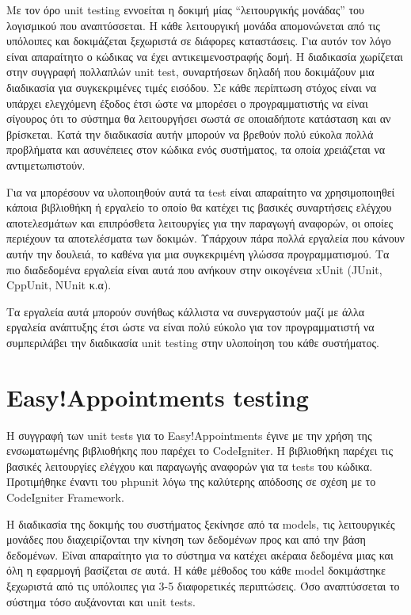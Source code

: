 Με τον όρο unit testing εννοείται η δοκιμή μίας “λειτουργικής μονάδας” του λογισμικού που αναπτύσσεται. Η κάθε λειτουργική μονάδα απομονώνεται από τις υπόλοιπες και δοκιμάζεται ξεχωριστά σε διάφορες καταστάσεις. Για αυτόν τον λόγο είναι απαραίτητο ο κώδικας να έχει αντικειμενοστραφής δομή. Η διαδικασία χωρίζεται στην συγγραφή πολλαπλών unit test, συναρτήσεων δηλαδή που δοκιμάζουν μια διαδικασία για συγκεκριμένες τιμές εισόδου. Σε κάθε περίπτωση στόχος είναι να υπάρχει ελεγχόμενη έξοδος έτσι ώστε να μπορέσει ο προγραμματιστής να είναι σίγουρος ότι το σύστημα θα λειτουργήσει σωστά σε οποιαδήποτε κατάσταση και αν βρίσκεται. Κατά την διαδικασία αυτήν μπορούν να βρεθούν πολύ εύκολα πολλά προβλήματα και ασυνέπειες στον κώδικα ενός συστήματος, τα οποία χρειάζεται να αντιμετωπιστούν. 

Για να μπορέσουν να υλοποιηθούν αυτά τα test είναι απαραίτητο να χρησιμοποιηθεί κάποια βιβλιοθήκη ή εργαλείο το οποίο θα κατέχει τις βασικές συναρτήσεις ελέγχου αποτελεσμάτων και επιπρόσθετα λειτουργίες για την παραγωγή αναφορών, οι οποίες περιέχουν τα αποτελέσματα των δοκιμών. Υπάρχουν πάρα πολλά εργαλεία που κάνουν αυτήν την δουλειά, το καθένα για μια συγκεκριμένη γλώσσα προγραμματισμού. Τα πιο διαδεδομένα εργαλεία είναι αυτά που ανήκουν στην οικογένεια xUnit (JUnit, CppUnit, NUnit κ.α).

Τα εργαλεία αυτά μπορούν συνήθως κάλλιστα να συνεργαστούν μαζί με άλλα εργαλεία ανάπτυξης έτσι ώστε να είναι πολύ εύκολο για τον προγραμματιστή να συμπεριλάβει την διαδικασία unit testing στην υλοποίηση του κάθε συστήματος.

\section {Easy!Appointments testing}
Η συγγραφή των unit tests για το Easy!Appointments έγινε με την χρήση της ενσωματωμένης βιβλιοθήκης που παρέχει το CodeIgniter. Η βιβλιοθήκη παρέχει τις βασικές λειτουργίες ελέγχου και παραγωγής αναφορών για τα tests του κώδικα. Προτιμήθηκε έναντι του phpunit λόγω της καλύτερης απόδοσης σε σχέση με το CodeIgniter Framework. 

Η διαδικασία της δοκιμής του συστήματος ξεκίνησε από τα models, τις λειτουργικές μονάδες που διαχειρίζονται την κίνηση των δεδομένων προς και από την βάση δεδομένων. Είναι απαραίτητο για το σύστημα να κατέχει ακέραια δεδομένα μιας και όλη η εφαρμογή βασίζεται σε αυτά. Η κάθε μέθοδος του κάθε model δοκιμάστηκε ξεχωριστά από τις υπόλοιπες για 3-5 διαφορετικές περιπτώσεις. Όσο αναπτύσσεται το σύστημα τόσο αυξάνονται και unit tests.

